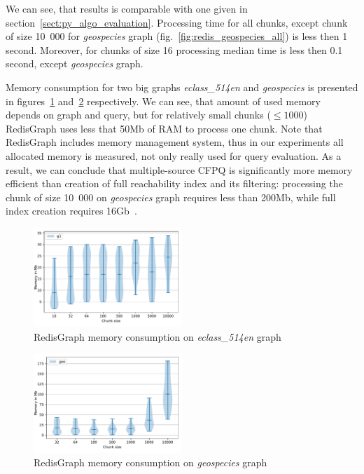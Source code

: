 We can see, that results is comparable with one given in section~\ref{sect:py_algo_evaluation}. 
Processing time for all chunks, except chunk of size 10~000 for \textit{geospecies} graph (fig.~\ref{fig:redis_geospecies_all}) is less then 1 second.
Moreover, for chunks of size 16 processing median time is less then 0.1 second, except \textit{geospecies} graph.

Memory consumption for two big graphs \textit{eclass\_514en} and \textit{geospecies} is presented in figures~\ref{fig:redis_memory_eclass} and~\ref{fig:redis_memory_geospecies} respectively.
We can see, that amount of used memory depends on graph and query, but for relatively small chunks ($\leq 1000$) RedisGraph uses less that 50Mb of RAM to process one chunk.
Note that RedisGraph includes memory management system, thus in our experiments all allocated memory is measured, not only really used for query evaluation.
As a result, we can conclude that multiple-source CFPQ is significantly more memory efficient than creation of full reachability index and its filtering: processing the chunk of size 10~000 on \textit{geospecies} graph requires less than 200Mb, while full index creation requires 16Gb~\cite{10.1145/3398682.3399163}.  

\begin{figure}[h]
\centering
\includegraphics[width=0.5\textwidth]{data/raw_memory/eclass_514en.pdf}
\caption{RedisGraph memory consumption on \textit{eclass\_514en} graph}
\label{fig:redis_memory_eclass}
\end{figure}

\begin{figure}[h]
\centering
\includegraphics[width=0.5\textwidth]{data/raw_memory/geospecies.pdf}
\caption{RedisGraph memory consumption on \textit{geospecies} graph}
\label{fig:redis_memory_geospecies}
\end{figure}


